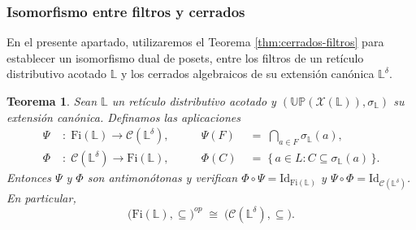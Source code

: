 \documentclass[12pt]{book}
\newtheorem{theorem}{Teorema}[section]
\newcommand{\Id}{\mathrm{Id}}
\newcommand{\Up}{\mathbb{UP}}
\begin{document}
\subsubsection{Isomorfismo entre filtros y cerrados}

En el presente apartado, utilizaremos el Teorema \ref{thm:cerrados-filtros}  para establecer un isomorfismo dual de posets, entre los filtros de un retículo distributivo acotado $\mathbb{L}$ y los cerrados algebraicos de su extensión canónica \(\mathbb{L}^\delta\).

\begin{theorem}\label{thm:dualidad-filtros-cerrados}
Sean \(\mathbb{L}\) un retículo distributivo acotado y
\((\Up(\mathcal{X}(\mathbb{L})),\sigma_{\mathbb{L}})\) su extensión canónica. Definamos las aplicaciones
\[
\begin{aligned}
\Psi \; &: \; \mathrm{Fi}(\mathbb{L}) \longrightarrow \mathcal{C}(\mathbb{L}^\delta), 
\qquad &\Psi(F) &\;=\; \bigcap_{a \in F} \sigma_{\mathbb{L}}(a),\\[4pt]
\Phi \; &: \; \mathcal{C}(\mathbb{L}^\delta) \longrightarrow \mathrm{Fi}(\mathbb{L}),
\qquad &\Phi(C) &\;=\; \{\,a \in L : C \subseteq \sigma_{\mathbb{L}}(a)\,\}.
\end{aligned}
\]
Entonces \(\Psi\) y \(\Phi\) son antimonótonas y verifican
\(\Phi\circ\Psi=\Id_{\mathrm{Fi}(\mathbb{L})}\) y
\(\Psi\circ\Phi=\Id_{\mathcal{C}(\mathbb{L}^\delta)}\). En particular,
\[
  \bigl(\mathrm{Fi}(\mathbb{L}),\subseteq\bigr)^{\!op}
  \;\cong\;
  \bigl(\mathcal{C}(\mathbb{L}^\delta),\subseteq\bigr).
\]
\end{theorem}
\end{document}
